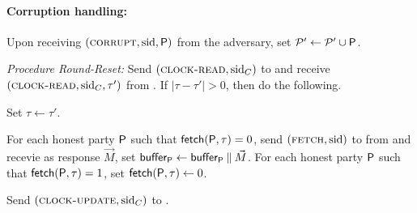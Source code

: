 \begin{cccFunctionality}
    \paragraph{Corruption handling:}
    \begin{cccItemize}[nosep]
        \item Upon receiving $(\textsc{corrupt}, \mathrm{sid}, \mathsf{P})$ from the adversary, set $\mathcal{P}' \gets \mathcal{P}' \cup \mathsf{P}$.
    \end{cccItemize}

    \medskip\emph{Procedure Round-Reset:}
    Send $(\textsc{clock-read}, \mathrm{sid}_C)$ to \funcDriftingClock and receive $(\textsc{clock-read}, \allowbreak \mathrm{sid}_C, \tau')$ from \funcDriftingClock. If $|\tau - \tau' | > 0$, then do the following.
    \begin{cccEnum}[nosep]
        \item Set $\tau \gets \tau'$.

        \item  For each honest party $\mathsf{P}$ such that $\mathsf{fetch}(\mathsf{P}, \tau) = 0$, send $(\textsc{fetch}, \mathrm{sid})$ to \funcDiffuse from \party and recevie as response $\vec{M}$, set $\mathsf{buffer}_\mathsf{P} \gets \mathsf{buffer}_\mathsf{P} \mathbin\Vert \vec{M}$.
        For each honest party $\mathsf{P}$ such that $\mathsf{fetch}(\mathsf{P}, \tau) = 1$, set $\mathsf{fetch}(\mathsf{P}, \tau) \gets 0$.

        \item Send $(\textsc{clock-update}, \mathrm{sid}_C)$ to \funcDriftingClock.
    \end{cccEnum}
\end{cccFunctionality}
